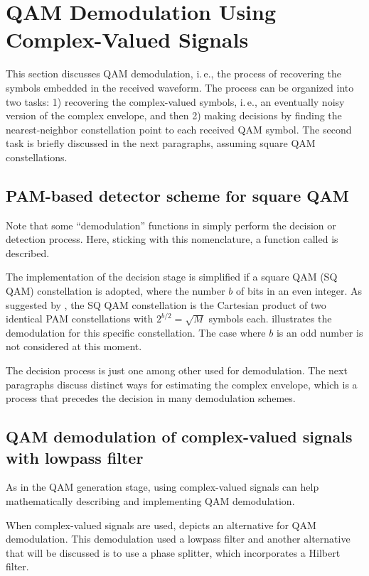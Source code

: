 \section{QAM Demodulation Using Complex-Valued Signals}

This section discusses QAM demodulation, i.\,e., the process of recovering the symbols embedded in the received waveform. The process can be organized into two tasks: 1) recovering the complex-valued
symbols, i.\,e., an eventually noisy version of the complex envelope, and then 2) making decisions
by finding the nearest-neighbor constellation point to each received QAM symbol. The second task
is briefly discussed in the next paragraphs, assuming square QAM constellations.


\subsection{PAM-based detector scheme for square QAM}

Note that 
some ``demodulation'' functions in {\matlab} simply perform the decision or detection process.
Here, sticking with this nomenclature, a function called  is described.

The implementation of the decision stage
is simplified if a square QAM (SQ QAM) constellation is adopted, where the number $b$ of bits in an even integer. As suggested by , the SQ QAM constellation is the Cartesian product of two identical PAM constellations with $2^{b/2}=\sqrt{M}$ symbols each.  illustrates the demodulation for this specific constellation. The case where $b$ is an odd number is not considered at this moment.


The decision process is just one among other used for demodulation. The next paragraphs discuss distinct ways for estimating the complex envelope, which is a process that precedes
the decision in many demodulation schemes.

\subsection{QAM demodulation of complex-valued signals with lowpass filter}

As in the QAM generation stage, using complex-valued signals can help mathematically describing and implementing QAM demodulation.

When complex-valued signals are used,  depicts an alternative for QAM demodulation. This demodulation used a lowpass filter and another alternative that will be discussed is to use a phase splitter, which incorporates a Hilbert filter.

